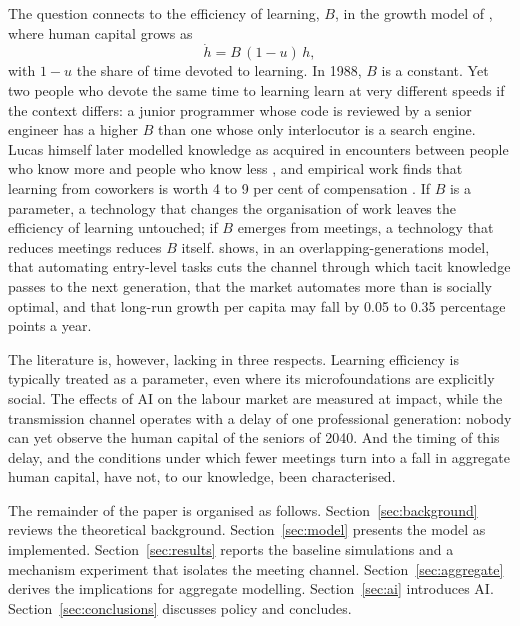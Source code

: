 \documentclass[preprint,12pt,authoryear]{elsarticle}
\begin{document}
The question connects to the efficiency of learning, $B$, in the growth model of \citet{Lucas1988}, where human capital grows as
\begin{equation}\label{eq:lucas}
\dot h = B\,(1-u)\,h,
\end{equation}
with $1-u$ the share of time devoted to learning. In 1988, $B$ is a constant. Yet two people who devote the same time to learning learn at very different speeds if the context differs: a junior programmer whose code is reviewed by a senior engineer has a higher $B$ than one whose only interlocutor is a search engine. Lucas himself later modelled knowledge as acquired in encounters between people who know more and people who know less \citep{Lucas2009,LucasMoll2014}, and empirical work finds that learning from coworkers is worth 4 to 9 per cent of compensation \citep{Jarosch2021,Herkenhoff2024}. If $B$ is a parameter, a technology that changes the organisation of work leaves the efficiency of learning untouched; if $B$ emerges from meetings, a technology that reduces meetings reduces $B$ itself. \citet{Ide2026} shows, in an overlapping-generations model, that automating entry-level tasks cuts the channel through which tacit knowledge passes to the next generation, that the market automates more than is socially optimal, and that long-run growth per capita may fall by 0.05 to 0.35 percentage points a year.

The literature is, however, lacking in three respects. Learning efficiency is typically treated as a parameter, even where its microfoundations are explicitly social. The effects of AI on the labour market are measured at impact, while the transmission channel operates with a delay of one professional generation: nobody can yet observe the human capital of the seniors of 2040. And the timing of this delay, and the conditions under which fewer meetings turn into a fall in aggregate human capital, have not, to our knowledge, been characterised.

The remainder of the paper is organised as follows. Section~\ref{sec:background} reviews the theoretical background. Section~\ref{sec:model} presents the model as implemented. Section~\ref{sec:results} reports the baseline simulations and a mechanism experiment that isolates the meeting channel. Section~\ref{sec:aggregate} derives the implications for aggregate modelling. Section~\ref{sec:ai} introduces AI. Section~\ref{sec:conclusions} discusses policy and concludes.

\end{document}
